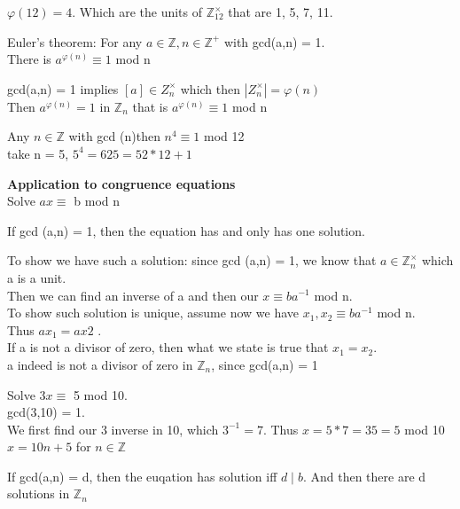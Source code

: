 \documentclass{article}
\newcommand\Z{\ensuremath{\mathbb{Z}}}
\begin{document}
\begin{Example}
    $\varphi(12) = 4.$ Which are the units of $\Z_{12}^\times$ that are 1, 5, 7, 11.
\end{Example}

\begin{theorem}
    Euler's theorem: For any $a \in \Z, n \in \Z^+$ with gcd(a,n) = 1.
    \\ There is $a^{\varphi(n)} \equiv 1 $ mod n 
\end{theorem}
\begin{Proof}
    gcd(a,n) = 1 implies $[a] \in Z_n^\times$ which then $|Z_n^\times| = \varphi(n)$
    \\ Then $a^{{\varphi(n)}} = 1$ in $\Z_n$ that is $a^{\varphi(n)} \equiv 1 $ mod n 
\end{Proof}

\begin{Example}
    Any $n \in  \Z $ with gcd (n)then $n^4 \equiv 1$ mod 12
    \\take n = 5, $5^4 = 625 = 52*12+1$
\end{Example}
\newpage

\begin{note}
\textbf{    Application to congruence equations}
    \\Solve $ax \equiv $ b mod n 
\end{note}
\begin{theorem}
    If gcd (a,n) = 1, then the equation has and only has one solution.
\end{theorem}

\begin{Proof}
    To show we have such a solution: since gcd (a,n) = 1, we know that $a \in \Z_n^\times$ which a is a unit.
    \\ Then we can find an inverse of a and then our $x\equiv ba^{-1}$ mod n.
    \\To show such solution is unique, assume now we have $x_1, x_2\equiv ba^{-1}$ mod n. 
    \\ Thus $ax_1 = ax2$ . 
    \\ If a is not a divisor of zero, then what we state is true that $x_1=x_2$. 
    \\a indeed is not a divisor of zero in $\Z_n$, since gcd(a,n) = 1    
\end{Proof}
\begin{Example}
    Solve $3x \equiv$ 5 mod 10.
    \\gcd(3,10) = 1.
    \\We first find our 3 inverse in 10, which $3^{-1} = 7$. Thus $x = 5*7 = 35 = 5$ mod 10
    \\ $x = 10n +5$ for $n \in \Z$
\end{Example}
 \begin{theorem}
     If gcd(a,n) = d, then the euqation has solution iff $d \mid b$. And then there are d solutions in $\Z_n$
 \end{theorem}
\end{document}
